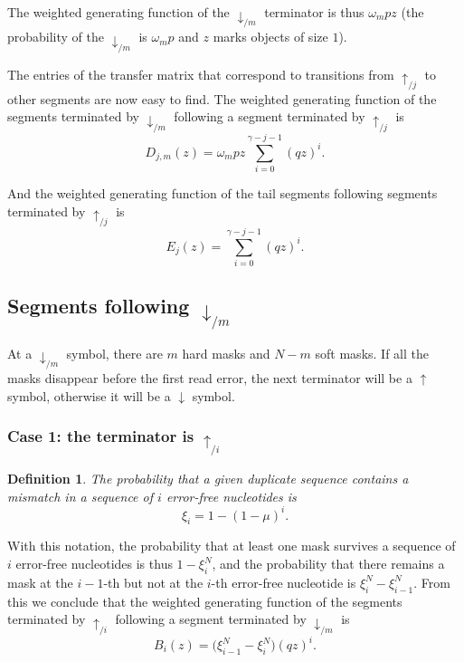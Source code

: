 \documentclass{article}
\newtheorem{definition}{Definition}
\begin{document}
The weighted generating function of the $\downarrow_{/m}$ terminator is
thus $\omega_m pz$ (the probability of the $\downarrow_{/m}$ is $\omega_m
p$ and $z$ marks objects of size $1$).

The entries of the transfer matrix that correspond to transitions from
$\uparrow_{/j}$ to other segments are now easy to find. The weighted
generating function of the segments terminated by $\downarrow_{/m}$
following a segment terminated by $\uparrow_{/j}$ is
\begin{equation}
\label{eq:D}
D_{j,m}(z) = \omega_m pz \sum_{i=0}^{\gamma-j-1} (qz)^i.
\end{equation}

And the weighted generating function of the tail segments following
segments terminated by $\uparrow_{/j}$ is
\begin{equation}
\label{eq:E}
E_j(z) = \sum_{i=0}^{\gamma-j-1} (qz)^i.
\end{equation}


\subsection{Segments following $\downarrow_{/m}$}

At a $\downarrow_{/m}$ symbol, there are $m$ hard masks and $N-m$ soft
masks. If all the masks disappear before the first read error, the next
terminator will be a $\uparrow$ symbol, otherwise it will be a
$\downarrow$ symbol.

\subsubsection*{Case 1: the terminator is $\uparrow_{/i}$}

\begin{definition}
The probability that a given duplicate sequence contains a mismatch in a
sequence of $i$ error-free nucleotides is
\begin{equation}
\label{eq:xi}
\xi_i = 1-(1-\mu)^i.
\end{equation}
\end{definition}

With this notation, the probability that at least one mask survives a
sequence of $i$ error-free nucleotides is thus $1-\xi_i^N$, and the
probability that there remains a mask at the $i-1$-th but not at the 
$i$-th error-free nucleotide is $\xi_i^N - \xi_{i-1}^N$. From this we
conclude that the weighted generating function of the segments terminated
by $\uparrow_{/i}$ following a segment terminated by $\downarrow_{/m}$ is
\begin{equation}
\label{eq:B}
B_i(z) = \Big( \xi_{i-1}^N-\xi_i^N \Big) (qz)^i.
\end{equation}
\end{document}
